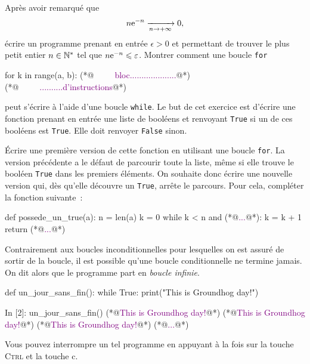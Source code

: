 \documentclass{magnolia}
\begin{document}
\begin{exos}
\exo Après avoir remarqué que
  \[n {\rm e}^{-n}\xrightarrow[n\rightarrow +\infty]{}0,\]
  écrire un programme prenant en entrée $\epsilon>0$ et permettant de trouver le plus petit entier $n\in{\mathbb{N}^*}$ tel que
  $n {\rm e}^{-n} \leqslant \varepsilon$.
\exo Montrer comment une boucle \verb_for_
\begin{pythoncode}
for k in range(a, b):
(*@\textcolor{purple}{\ \ \ \ \ bloc....................}@*)
(*@\textcolor{purple}{\ \ \ \ \ ..........d'instructions}@*)
\end{pythoncode}
peut s'écrire à l'aide d'une boucle \verb_while_.
\exo Le but de cet exercice est d'écrire une fonction prenant en entrée une liste de
  booléens et renvoyant \verb!True!
  si un de ces booléens est \verb_True_. Elle doit renvoyer \verb!False! sinon.
  \begin{questions}
  \question Écrire une première version de cette fonction en utilisant une boucle \verb!for!.
  \question La version précédente a le défaut de parcourir toute la liste, même si elle
    trouve le booléen \verb!True! dans les premiers éléments. On souhaite
    donc écrire une nouvelle version qui, dès qu'elle découvre un \verb!True!,
    arrête le parcours. Pour cela, compléter la fonction suivante~:
\begin{pythoncodeline}
def possede_un_true(a):
    n = len(a)
    k = 0
    while k < n and (*@\textcolor{purple}{...}@*):
        k = k + 1
    return (*@\textcolor{purple}{...}@*)
\end{pythoncodeline}
  \end{questions}
\end{exos}
\vspace{2ex}
Contrairement aux boucles inconditionnelles pour lesquelles on est assuré
de sortir de la boucle, il est possible qu'une boucle conditionnelle ne termine jamais.
On dit alors que le programme part en \emph{boucle infinie}. 

\begin{pythoncodeline}
def un_jour_sans_fin():
    while True:
        print("This is Groundhog day!")
\end{pythoncodeline}

\begin{pythoncode}
In [2]: un_jour_sans_fin()
(*@\textcolor{purple}{This is Groundhog day!}@*)
(*@\textcolor{purple}{This is Groundhog day!}@*)
(*@\textcolor{purple}{This is Groundhog day!}@*)
(*@\textcolor{purple}{...}@*)
\end{pythoncode}
\noindent Vous pouvez interrompre un tel programme en appuyant à la fois sur la touche \og \textsc{Ctrl} \fg et la touche \og c\fg.\\
\end{document}
